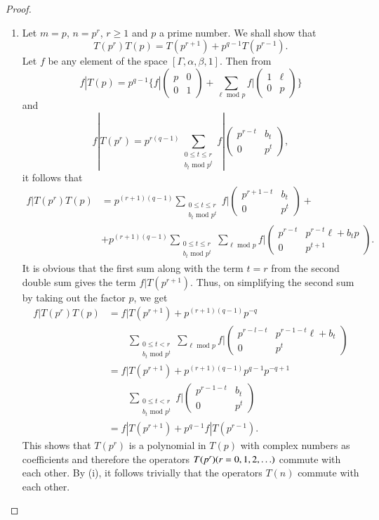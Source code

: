 \begin{proof}
\begin{enumerate}
\item Let $m=p$, $n= p^r$, $r\geq 1$ and $p$ a prime number. We shall
  show that 
$$
T(p^r) T(p) = T(p^{r+1}) + p^{q-1} T(p^{r-1}). 
$$
Let $f$ be any element of the space $[\Gamma, \alpha, \beta, 1]$. Then
from 
$$
f|T(p) = p^{q-1} \{f| \begin{pmatrix} 
p&0\\0&1
\end{pmatrix} + \sum_{\ell \text{ mod } p} f|\begin{pmatrix}
1&\ell\\0&p
\end{pmatrix}\}
$$\pageoriginale  
and 
$$
f|T(p^r) = p^{r(q-1)} \sum_{\substack{0\leq t \leq r\\b_t \text{ mod } p^t}}
f| \begin{pmatrix}
p^{r-t} & b_t\\
0 & p^t
\end{pmatrix},
$$
it follows that 
\begin{align*}
f|T(p^r) T(p) & = p^{(r+1)(q-1)} \sum_{\substack{0\leq t \leq r\\b_t
    \text{ mod } p^t}} f|\begin{pmatrix}
p^{r+1-t } & b_t\\
0 & p^t
\end{pmatrix}+\\
& + p^{(r+1)(q-1)} \sum_{\substack{0\leq t \leq r\\
b_t \text{ mod } p^t}} \sum_{\ell \text{ mod } p} f| \begin{pmatrix}
p^{r-t} & p^{r-t}\ell+b_tp\\
0 & p^{t+1}
\end{pmatrix}.
\end{align*}
It is obvious that the first sum along with the term $t=r$ from the
second double sum gives the term $f|T(p^{r+1})$. Thus, on simplifying
the second sum by taking out the factor $p$, we get 
\begin{align*}
f|T(p^r) T(p) & = f|T(p^{r+1}) + p^{(r+1)(q-1)} p^{-q}\\
&\qquad\sum_{\substack{0\leq t < r\\b_t\text{ mod } p^t}} \sum_{\ell \text{ mod } p}
f| \begin{pmatrix}
p^{r-l-t} & p^{r-1-t} \ell+b_t\\
0 & p^t
\end{pmatrix}\\
& = f|T(p^{r+1}) + p^{(r+1)(q-1)} p^{q-1} p^{-q+1}\\
&\qquad\sum_{\substack{0\leq t < r\\ b_t \text{ mod } p^t}} f|\begin{pmatrix}
p^{r-1-t} & b_t\\
0 & p^t
\end{pmatrix}\\
& = f|T(p^{r+1}) + p^{q-1} f|T(p^{r-1}).
\end{align*}
This shows that $T(p^r)$ is a polynomial in $T(p)$ with complex
numbers as coefficients and therefore the operators
$T(p^r)(r=0,1,\break 2,\ldots)$ commute with each other. By (i), it follows
trivially that the operators $T(n)$ commute with each other. 


\end{enumerate}
\end{proof}
